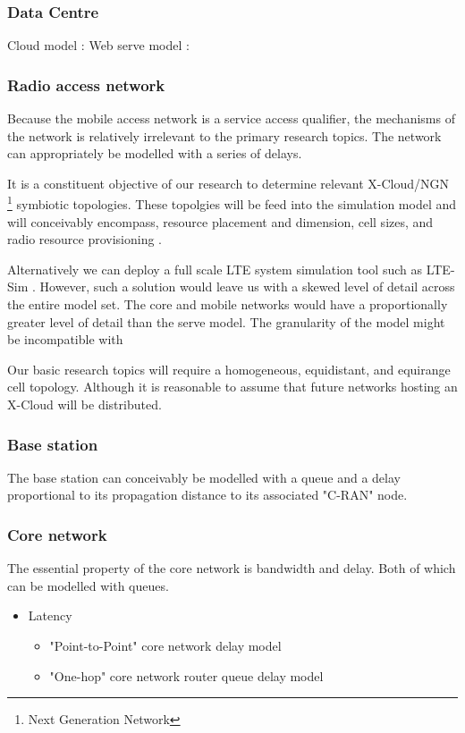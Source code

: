 \subsubsection{Data Centre}
Cloud model : \cite{5959161}
Web serve model : \cite{1191656}

\subsubsection{Radio access network}
Because the mobile access network is a service access qualifier, the mechanisms of the network is relatively irrelevant to the primary research topics. The network can appropriately be modelled with a series of delays. 

It is a constituent objective of our research to determine relevant X-Cloud/NGN \footnote{Next Generation Network} symbiotic topologies. These topolgies will be feed into the simulation model and will conceivably encompass, resource placement and dimension, cell sizes, and radio resource provisioning \cite{kwan2010mobility,racz2007handover,salo2010practical}.

Alternatively we can deploy a full scale LTE system simulation tool such as LTE-Sim \cite{5634134}. However, such a solution would leave us with a skewed level of detail across the entire model set. The core and mobile networks would have a proportionally greater level of detail than the serve model. The granularity of the model might be incompatible with 

Our basic research topics will require a homogeneous, equidistant, and equirange cell topology. Although it is reasonable to assume that future networks hosting an X-Cloud will be distributed. 

\subsubsection{Base station}
The base station can conceivably be modelled with a queue and a delay proportional to its propagation distance to its associated "C-RAN" node.

\subsubsection{Core network}
The essential property of the core network is bandwidth and delay. Both of which can be modelled with queues.

\begin{itemize}
\item Latency
\begin{itemize}
\item "Point-to-Point" core network delay model \cite{choi2007analysis}
\item "One-hop" core network router queue delay model  \cite{papagiannaki2003measurement}
\end{itemize}
\end{itemize}

